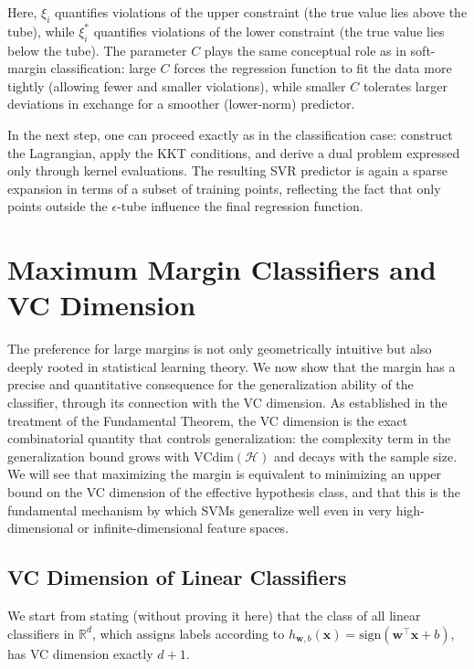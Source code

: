 Here, $\xi_i$ quantifies violations of the upper constraint (the true value lies above the tube), while $\xi_i^*$ quantifies violations of the lower constraint (the true value lies below the tube). The parameter $C$ plays the same conceptual role as in soft-margin classification: large $C$ forces the regression function to fit the data more tightly (allowing fewer and smaller violations), while smaller $C$ tolerates larger deviations in exchange for a smoother (lower-norm) predictor.

\medskip

In the next step, one can proceed exactly as in the classification case: construct the Lagrangian, apply the KKT conditions, and derive a dual problem expressed only through kernel evaluations. The resulting SVR predictor is again a sparse expansion in terms of a subset of training points, reflecting the fact that only points outside the $\epsilon$-tube influence the final regression function.

\section*{Maximum Margin Classifiers and VC Dimension}

The preference for large margins is not only geometrically intuitive but also deeply rooted
in statistical learning theory. We now show that the margin has a precise and quantitative
consequence for the generalization ability of the classifier, through its connection with the
VC dimension. As established in the treatment of the Fundamental Theorem, the VC dimension
is the exact combinatorial quantity that controls generalization: the complexity term in the
generalization bound grows with $\mathrm{VCdim}(\mathcal{H})$ and decays
with the sample size. We will see that maximizing the margin is equivalent to minimizing an
upper bound on the VC dimension of the effective hypothesis class, and that this is the
fundamental mechanism by which SVMs generalize well even in very high-dimensional or
infinite-dimensional feature spaces.

\subsection*{VC Dimension of Linear Classifiers}

We start from stating (without proving it here) that the class of all linear classifiers in $\mathbb{R}^d$, which assigns labels according to
$h_{\mathbf{w},b}(\mathbf{x}) = \mathrm{sign}(\mathbf{w}^\top \mathbf{x} + b)$, has VC
dimension exactly $d+1$.

